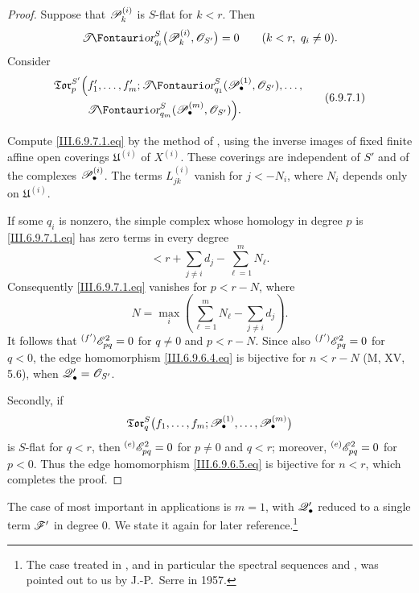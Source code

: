 \begin{proof}
Suppose that $\mathscr{P}_k^{(i)}$ is $S$-flat for $k<r$.  Then
\[
  \shTor_{q_i}^S
  \bigl(
    \sh P_k^{(i)},\sh O_{S'}
  \bigr)
  =
  0
  \qquad
  (k<r,\ q_i\neq0).
\]
Consider
\[
\begin{split}
  \mathfrak{Tor}_p^{S'}
  \Bigl(
    &
    f_1',\ldots,f_m';
    \shTor_{q_1}^S
    (\sh P_\bullet^{(1)},\sh O_{S'}),\ldots,
    \\
    &
    \shTor_{q_m}^S
    (\sh P_\bullet^{(m)},\sh O_{S'})
  \Bigr).
\end{split}
  \tag{6.9.7.1}\label{III.6.9.7.1.eq}
\]


Compute \eqref{III.6.9.7.1.eq} by the method of
, using the inverse images of fixed finite affine
open coverings $\mathfrak U^{(i)}$ of $X^{(i)}$.  These coverings
are independent of $S'$ and of the complexes
$\mathscr{P}_\bullet^{(i)}$.  The terms $L_{jk}^{(i)}$ vanish for
$j<-N_i$, where $N_i$ depends only on $\mathfrak U^{(i)}$.

If some $q_i$ is nonzero, the simple complex whose homology in
degree $p$ is \eqref{III.6.9.7.1.eq} has zero terms in every degree
\[
  <
  r+\sum_{j\neq i}d_j-\sum_{\ell=1}^mN_\ell.
\]
Consequently \eqref{III.6.9.7.1.eq} vanishes for $p<r-N$, where
\[
  N
  =
  \max_i
  \left(
    \sum_{\ell=1}^mN_\ell-\sum_{j\neq i}d_j
  \right).
\]
It follows that
${}^{(f')}\mathscr{E}_{pq}^2=0$ for $q\neq0$ and $p<r-N$.
Since also ${}^{(f')}\mathscr{E}_{pq}^2=0$ for $q<0$, the edge
homomorphism \eqref{III.6.9.6.4.eq} is bijective for $n<r-N$
(M, XV, 5.6), when $\mathscr{Q}_\bullet'=\mathscr{O}_{S'}$.

Secondly, if
\[
  \mathfrak{Tor}_q^S
  \bigl(
    f_1,\ldots,f_m;
    \mathscr{P}_\bullet^{(1)},\ldots,\mathscr{P}_\bullet^{(m)}
  \bigr)
\]
is $S$-flat for $q<r$, then
${}^{(e)}\mathscr{E}_{pq}^2=0$ for $p\neq0$ and $q<r$; moreover,
${}^{(e)}\mathscr{E}_{pq}^2=0$ for $p<0$.  Thus the edge homomorphism
\eqref{III.6.9.6.5.eq} is bijective for $n<r$, which completes the
proof.
\end{proof}

The case of  most important in applications is
$m=1$, with $\mathscr{Q}_\bullet'$ reduced to a single term $\mathscr{F}'$ in
degree $0$.  We state it again for later reference.\footnote{The
case treated in , and in particular the spectral
sequences  and , was pointed
out to us by J.-P.~Serre in 1957.}

